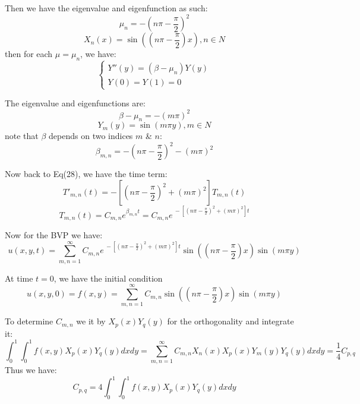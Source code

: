 \documentclass[12pt]{article} %
\begin{document}
Then we have the eigenvalue and eigenfunction as such:
$$
\mu_{n} = -(n\pi -\frac{\pi}{2})^{2}
$$
$$
X_{n}(x) = \sin((n\pi - \frac{\pi}{2})x), n \in N
$$then for each $\mu = \mu_{n}$, we have:
$$
\left\{
\begin{array}{lll}
Y''(y) = (\beta -\mu_{n})Y(y)\\
Y(0)=Y(1)=0
\end{array}\right.
$$\par
The eigenvalue and eigenfunctions are:
$$
\beta - \mu_{n} = -(m\pi)^{2}
$$
$$
Y_{m}(y) = \sin(m\pi y), m \in N
$$
note that $\beta$ depends on two indices $m$ \& $n$:
$$
\beta_{m, n} =  -(n\pi -\frac{\pi}{2})^{2} -(m\pi)^{2}
$$\par
Now back to Eq(28), we have the time term:
$$
T'_{m,n}(t) =  -[(n\pi -\frac{\pi}{2})^{2} +(m\pi)^{2}]T_{m,n}(t)
$$
\begin{equation}
T_{m,n}(t) = C_{m,n}e^{\beta_{m,n}t}=C_{m,n}e^{\ -[(n\pi -\frac{\pi}{2})^{2} +(m\pi)^{2}]t}
\end{equation}\par
Now for the BVP we have:
$$
u(x, y, t) = \sum_{m,n = 1}^{\infty}C_{m,n}e^{\ -[(n\pi -\frac{\pi}{2})^{2} +(m\pi)^{2}]t} \sin((n\pi - \frac{\pi}{2})x)\sin(m\pi y)
$$\par
At time $t=0$, we have the initial condition
$$u(x, y, 0) = f(x, y) = \sum_{m,n = 1}^{\infty}C_{m,n}\sin((n\pi - \frac{\pi}{2})x)\sin(m\pi y)
$$\par
To determine $C_{m,n}$ we it by $X_{p}(x)Y_{q}(y)$ for the orthogonality and integrate it:
$$
\int_{0}^{1}\int_{0}^{1}f(x, y)X_{p}(x)Y_{q}(y)dxdy =  \sum_{m,n = 1}^{\infty}C_{m,n}X_{n}(x)X_{p}(x)Y_{m}(y)Y_{q}(y)dxdy = \frac{1}{4}C_{p, q}
$$
Thus we have:
$$
C_{p, q} = 4\int_{0}^{1}\int_{0}^{1}f(x, y)X_{p}(x)Y_{q}(y)dxdy
$$
\end{document}
